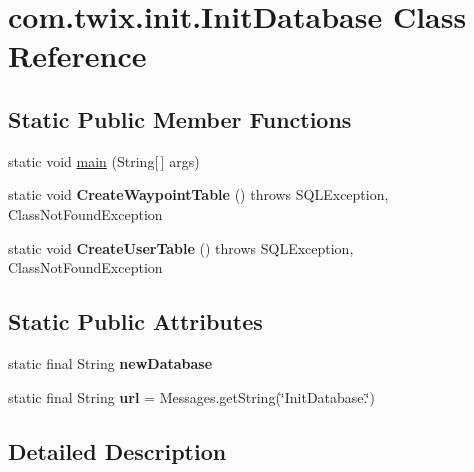 \hypertarget{classcom_1_1twix_1_1init_1_1_init_database}{\section{com.\-twix.\-init.\-Init\-Database Class Reference}
\label{classcom_1_1twix_1_1init_1_1_init_database}
}
\subsection*{Static Public Member Functions}
\begin{DoxyCompactItemize}
\item 
static void \hyperlink{classcom_1_1twix_1_1init_1_1_init_database_ae34ebcf5fd998c49414bffe96711c09e}{main} (String\mbox{[}$\,$\mbox{]} args)
\item 
\hypertarget{classcom_1_1twix_1_1init_1_1_init_database_ac83accde45ec0ff8cd3840975c465a26}{static void {\bfseries Create\-Waypoint\-Table} ()  throws S\-Q\-L\-Exception, 			\-Class\-Not\-Found\-Exception }\label{classcom_1_1twix_1_1init_1_1_init_database_ac83accde45ec0ff8cd3840975c465a26}

\item 
\hypertarget{classcom_1_1twix_1_1init_1_1_init_database_a0586f4eaeea8961c543fa0596c051782}{static void {\bfseries Create\-User\-Table} ()  throws S\-Q\-L\-Exception, 			\-Class\-Not\-Found\-Exception }\label{classcom_1_1twix_1_1init_1_1_init_database_a0586f4eaeea8961c543fa0596c051782}

\end{DoxyCompactItemize}
\subsection*{Static Public Attributes}
\begin{DoxyCompactItemize}
\item 
static final String {\bfseries new\-Database}
\item 
\hypertarget{classcom_1_1twix_1_1init_1_1_init_database_a5e9de9bc6a80da907b9b8ef40c6683b4}{static final String {\bfseries url} = Messages.\-get\-String(\char`\"{}Init\-Database.\char`\"{})}\label{classcom_1_1twix_1_1init_1_1_init_database_a5e9de9bc6a80da907b9b8ef40c6683b4}

\end{DoxyCompactItemize}


\subsection{Detailed Description}


